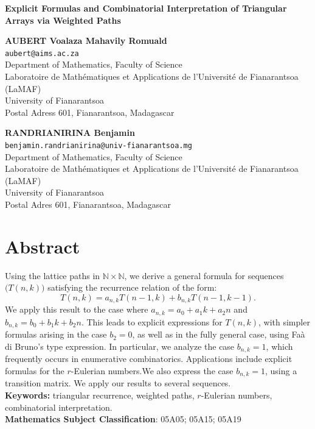 \documentclass[12pt,a4paper]{article}
\theoremstyle{definition} %
\theoremstyle{remark}
\theoremstyle{examples}
\newcommand{\suit}[1]{{#1}(n,k)}
\newcommand{\coul}[1]{#1_{n,k}}
\newcommand{\nkid}{}
\begin{document}
	
	
\begin{center}
	
	{\huge\bf Explicit Formulas and Combinatorial Interpretation of Triangular Arrays via Weighted Paths}
	
	\vspace{0.5cm}
	
	\textbf{AUBERT Voalaza Mahavily Romuald} \\
	\texttt{aubert@aims.ac.za} \\
	Department of Mathematics, Faculty of Science \\
	Laboratoire de Mathématiques et Applications de l’Université de Fianarantsoa (LaMAF) \\
	University of Fianarantsoa \\
	Postal Adress 601, Fianarantsoa, Madagascar
	
	\vspace{0.5cm}
	
	\textbf{RANDRIANIRINA Benjamin} \\
	\texttt{benjamin.randrianirina@univ-fianarantsoa.mg} \\
	Department of Mathematics, Faculty of Science \\
	Laboratoire de Mathématiques et Applications de l’Université de Fianarantsoa (LaMAF) \\
	University of Fianarantsoa \\
	Postal Adres 601, Fianarantsoa, Madagascar
\end{center}
	
	\section*{Abstract} 
	Using the lattice paths in  $\mathbb{N}\times\mathbb{N}$, we derive a general formula for sequences $\big(\suit{T}\big)\nkid$ satisfying the recurrence relation of the form:
	\begin{equation*}
	\suit{T}=\coul{a}T(n-1,k)+\coul{b}T(n-1,k-1).
	\end{equation*}
	We apply this result to the  case where $a_{n,k}=a_0+a_1k+a_2n$ and $b_{n,k}=b_0+b_1k+b_2n$. 
	This leads to explicit expressions for $\suit{T}$, with simpler formulas arising in the case $b_2=0$, as well as in the fully general case, using Fa\`a di Bruno's type expression. In particular, we analyze the case  $b_{n,k}=1$, which frequently occurs in enumerative combinatorics. Applications include explicit formulas for the $r$-Eulerian numbers.We also express the case $b_{n,k}=1$, using a transition matrix. We apply our results to several sequences.\\
	\textbf{Keywords:} triangular recurrence, weighted paths, $r$-Eulerian numbers, combinatorial interpretation.
	\\ \textbf{Mathematics Subject Classification}: 05A05; 05A15; 05A19
\end{document}

